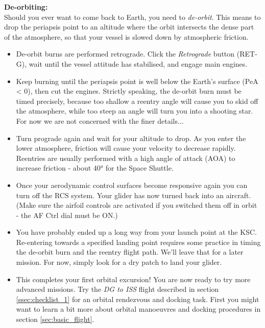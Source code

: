\documentclass[Orbiter User Manual.tex]{subfiles}
\begin{document}
\noindent
\begin{figure}[H]
	\centering
\end{figure}

\noindent
\textbf{De-orbiting:}\\
Should you ever want to come back to Earth, you need to \textit{de-orbit}. This means to drop the periapsis point to an altitude where the orbit intersects the dense part of the atmosphere, so that your vessel is slowed down by atmospheric friction.

\begin{itemize}
\item De-orbit burns are performed retrograde. Click the \textit{Retrograde} button (RET-G), wait until the vessel attitude has stabilised, and engage main engines.
\item Keep burning until the periapsis point is well below the Earth's surface (PeA < 0), then cut the engines. Strictly speaking, the de-orbit burn must be timed precisely, because too shallow a reentry angle will cause you to skid off the atmosphere, while too steep an angle will turn you into a shooting star. For now we are not concerned with the finer details...
\item Turn prograde again and wait for your altitude to drop. As you enter the lower atmosphere, friction will cause your velocity to decrease rapidly. Reentries are usually performed with a high angle of attack (AOA) to increase friction - about 40° for the Space Shuttle.
\item Once your aerodynamic control surfaces become responsive again you can turn off the RCS system. Your glider has now turned back into an aircraft. (Make sure the airfoil controls are activated if you switched them off in orbit - the AF Ctrl dial must be ON.)
\item You have probably ended up a long way from your launch point at the KSC. Re-entering towards a specified landing point requires some practice in timing the de-orbit burn and the reentry flight path. We'll leave that for a later mission. For now, simply look for a dry patch to land your glider.
\item This completes your first orbital excursion!
You are now ready to try more advanced missions. Try the \textit{DG to ISS} flight described in section \ref{ssec:checklist_1} for an orbital rendezvous and docking task. First you might want to learn a bit more about orbital manoeuvres and docking procedures in section \ref{sec:basic_flight}.
\end{itemize}
\end{document}
